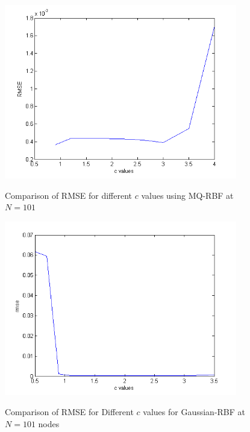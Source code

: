 \documentclass[12pt]{article}
\numberwithin{equation}{subsection} %
\begin{document}
 \begin{figure}[h]
\begin{center}
\includegraphics*[height=3in]{cmqlg.png}\
\end{center}
\vspace{0.3in}
%
\caption{Comparison of RMSE for different $c$ values using MQ-RBF at
$N=101$}
\end{figure}


\newpage
 \begin{figure}[h]
\begin{center}
\includegraphics*[height=3in]{cgaulg.png}\
\end{center}
\vspace{-0.3in}
\caption{Comparison of RMSE for Different $c$ values for
Gaussian-RBF at $N=101$ nodes }

\end{figure}
\end{document}
